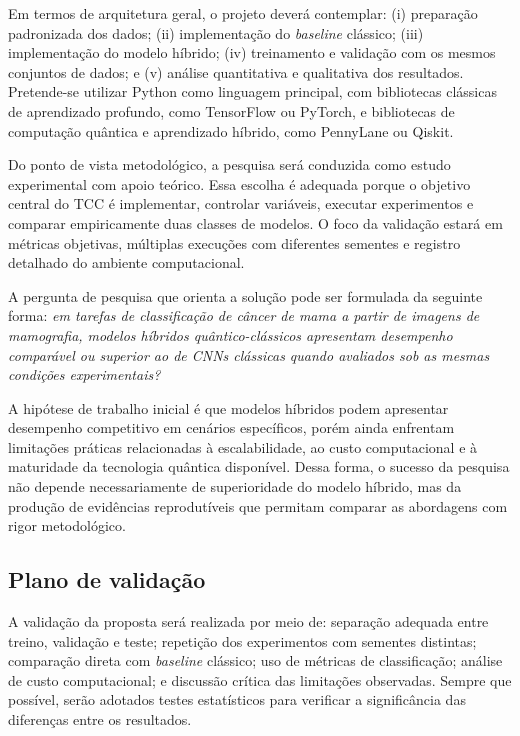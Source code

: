 \documentclass[
    12pt,
    openright,
    oneside,
    a4paper,
    english,
    brazil
]{abntex2}
\begin{document}
Em termos de arquitetura geral, o projeto deverá contemplar: (i) preparação padronizada dos dados; (ii) implementação do \textit{baseline} clássico; (iii) implementação do modelo híbrido; (iv) treinamento e validação com os mesmos conjuntos de dados; e (v) análise quantitativa e qualitativa dos resultados. Pretende-se utilizar Python como linguagem principal, com bibliotecas clássicas de aprendizado profundo, como TensorFlow ou PyTorch, e bibliotecas de computação quântica e aprendizado híbrido, como PennyLane ou Qiskit.

Do ponto de vista metodológico, a pesquisa será conduzida como estudo experimental com apoio teórico. Essa escolha é adequada porque o objetivo central do TCC é implementar, controlar variáveis, executar experimentos e comparar empiricamente duas classes de modelos. O foco da validação estará em métricas objetivas, múltiplas execuções com diferentes sementes e registro detalhado do ambiente computacional.

A pergunta de pesquisa que orienta a solução pode ser formulada da seguinte forma: \textit{em tarefas de classificação de câncer de mama a partir de imagens de mamografia, modelos híbridos quântico-clássicos apresentam desempenho comparável ou superior ao de CNNs clássicas quando avaliados sob as mesmas condições experimentais?}

A hipótese de trabalho inicial é que modelos híbridos podem apresentar desempenho competitivo em cenários específicos, porém ainda enfrentam limitações práticas relacionadas à escalabilidade, ao custo computacional e à maturidade da tecnologia quântica disponível. Dessa forma, o sucesso da pesquisa não depende necessariamente de superioridade do modelo híbrido, mas da produção de evidências reprodutíveis que permitam comparar as abordagens com rigor metodológico.

\subsection*{Plano de validação}

A validação da proposta será realizada por meio de: separação adequada entre treino, validação e teste; repetição dos experimentos com sementes distintas; comparação direta com \textit{baseline} clássico; uso de métricas de classificação; análise de custo computacional; e discussão crítica das limitações observadas. Sempre que possível, serão adotados testes estatísticos para verificar a significância das diferenças entre os resultados.
\end{document}
